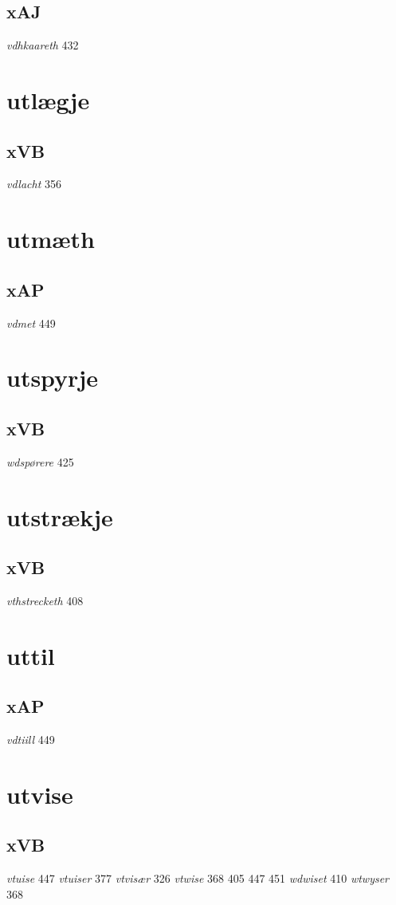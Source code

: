 \documentclass[a4paper,twocolumn]{article}
\begin{document}
\subsection{xAJ}
\label{sec:orgdedb02d}
\emph{vdhkaareth} 432 
\section{utlægje}
\label{sec:orgd3010a0}
\subsection{xVB}
\label{sec:org6fdcabb}
\emph{vdlacht} 356 
\section{utmæth}
\label{sec:orgf349414}
\subsection{xAP}
\label{sec:org3161f80}
\emph{vdmet} 449 
\section{utspyrje}
\label{sec:orgf89ea5f}
\subsection{xVB}
\label{sec:org3e7b7b6}
\emph{wdspørere} 425 
\section{utstrækje}
\label{sec:orgc32db6a}
\subsection{xVB}
\label{sec:org3339e01}
\emph{vthstrecketh} 408 
\section{uttil}
\label{sec:orgd315281}
\subsection{xAP}
\label{sec:org1cd9f49}
\emph{vdtiill} 449 
\section{utvise}
\label{sec:orgffd7360}
\subsection{xVB}
\label{sec:orgdf1b759}
\emph{vtuise} 447 \emph{vtuiser} 377 \emph{vtvisær} 326 \emph{vtwise} 368 405 447 451 \emph{wdwiset} 410 \emph{wtwyser} 368 
\end{document}
